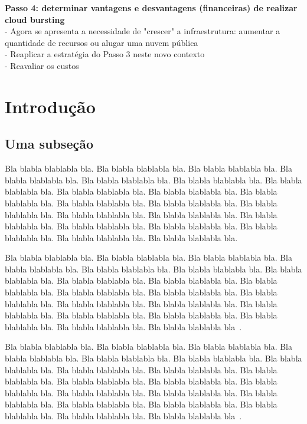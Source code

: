 \documentclass[tese,capa]{texufpel}
\begin{document}
\textbf{Passo 4: determinar vantagens e desvantagens (financeiras) de realizar cloud bursting}\\
- Agora se apresenta a necessidade de "crescer" a infraestrutura: aumentar a quantidade de recursos ou alugar uma nuvem pública\\
- Reaplicar a estratégia do Passo 3 neste novo contexto\\
- Reavaliar os custos\\

\chapter{Introdução}

\section{Uma subseção}
Bla blabla blablabla bla.  Bla blabla blablabla bla.  Bla blabla
blablabla bla.  Bla blabla blablabla bla.  Bla blabla blablabla bla.
Bla blabla blablabla bla.  Bla blabla blablabla bla.  Bla blabla
blablabla bla.  Bla blabla blablabla bla.  Bla blabla blablabla bla.
Bla blabla blablabla bla.  Bla blabla blablabla bla.  Bla blabla
blablabla bla.  Bla blabla blablabla bla.  Bla blabla blablabla bla.
Bla blabla blablabla bla.  Bla blabla blablabla bla.  Bla blabla
blablabla bla.  Bla blabla blablabla bla.  Bla blabla blablabla bla.
Bla blabla blablabla bla.

Bla blabla blablabla bla.  Bla blabla blablabla bla.  Bla blabla
blablabla bla.  Bla blabla blablabla bla.  Bla blabla blablabla bla.
Bla blabla blablabla bla.  Bla blabla blablabla bla.  Bla blabla
blablabla bla.  Bla blabla blablabla bla.  Bla blabla blablabla bla.
Bla blabla blablabla bla.  Bla blabla blablabla bla.  Bla blabla
blablabla bla.  Bla blabla blablabla bla.  Bla blabla blablabla bla.
Bla blabla blablabla bla.  Bla blabla blablabla bla.  Bla blabla
blablabla bla.  Bla blabla blablabla bla.  Bla blabla blablabla bla.
Bla blabla blablabla bla~\citet{Moore:1979:MAI,Aguiar:2005}.

Bla blabla blablabla bla.  Bla blabla blablabla bla.  Bla blabla
blablabla bla.  Bla blabla blablabla bla.  Bla blabla blablabla bla.
Bla blabla blablabla bla.  Bla blabla blablabla bla.  Bla blabla
blablabla bla.  Bla blabla blablabla bla.  Bla blabla blablabla bla.
Bla blabla blablabla bla.  Bla blabla blablabla bla.  Bla blabla
blablabla bla.  Bla blabla blablabla bla.  Bla blabla blablabla bla.
Bla blabla blablabla bla.  Bla blabla blablabla bla.  Bla blabla
blablabla bla.  Bla blabla blablabla bla.  Bla blabla blablabla bla.
Bla blabla blablabla bla~\cite{vonNeumann:1966:TSR}.
\end{document}
